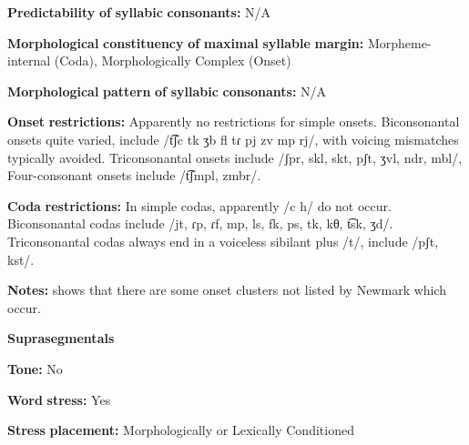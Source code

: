 \documentclass[output=paper]{langsci/langscibook}
\begin{document}
\begin{styleBody}
\textbf{Predictability} \textbf{of} \textbf{syllabic} \textbf{consonants:} N/A
\end{styleBody}

\begin{styleBody}
\textbf{Morphological} \textbf{constituency} \textbf{of} \textbf{maximal} \textbf{syllable} \textbf{margin:} Morpheme-internal (Coda), Morphologically Complex (Onset)
\end{styleBody}

\begin{styleBody}
\textbf{Morphological} \textbf{pattern} \textbf{of} \textbf{syllabic} \textbf{consonants:} N/A
\end{styleBody}

\begin{styleBody}
\textbf{Onset} \textbf{restrictions:} Apparently no restrictions for simple onsets. Biconsonantal onsets quite varied, include /t͡ʃc tk ʒb fl tɾ pj zv mp rj/, with voicing mismatches typically avoided. Triconsonantal onsets include /ʃpr, skl, skt, pʃt, ʒvl, ndr, mbl/, Four-consonant onsets include /t͡ʃmpl, zmbr/.
\end{styleBody}

\begin{styleBody}
\textbf{Coda} \textbf{restrictions:} In simple codas, apparently /c h/ do not occur. Biconsonantal codas include /jt, ɾp, ɾf, mp, ls, fk, ps, tk,  kθ, t͡sk, ʒd/. Triconsonantal codas always end in a voiceless sibilant plus /t/, include /pʃt, kst/.
\end{styleBody}

\begin{styleBody}
\textbf{Notes:} \citet{Klippenstein2010} shows that there are some onset clusters not listed by Newmark which occur.
\end{styleBody}

\begin{styleBody}
\textbf{Suprasegmentals}
\end{styleBody}

\begin{styleBody}
\textbf{Tone:} No
\end{styleBody}

\begin{styleBody}
\textbf{Word} \textbf{stress:} Yes
\end{styleBody}

\begin{styleBody}
\textbf{Stress} \textbf{placement:} Morphologically or Lexically Conditioned
\end{styleBody}
\end{document}
